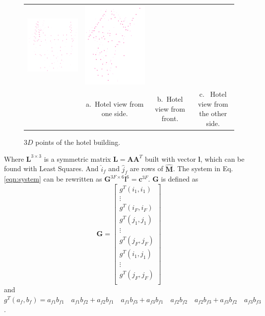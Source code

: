 \documentclass[]{IEEEtran}
\begin{document}
\begin{figure}[tb]
\begin{tabular}{c c c c}
    \includegraphics[width=0.3\linewidth]{./figures/3d/cv/snapshot01.png} &
    \includegraphics[width=0.22\linewidth]{./figures/3d/cv/snapshot02.png}\\
    & a.~Hotel view from one side. & b.~Hotel view from front. & c.~ Hotel view from the other side.\\
    \end{tabular}
    \caption{$3D$ points of the hotel building.}
    \label{fig:3dcloud}
\end{figure}

Where $\bm{L}^{3 \times 3}$ is a symmetric matrix $\bm{L} = \bm{A}\bm{A}^T$ built with vector $\bm{l}$, which can be found with Least Squares. And $\hat{i}_{f}$ and $\hat{j}_{f}$ are rows of $\hat{\bm{M}}$. The system in Eq. \ref{eqn:system} can be rewritten as $\bm{G}^{3F \times 6}\bm{l}^6 = \bm{c}^{3F}$. $\bm{G}$ is defined as
\[
\bm{G} =
\begin{bmatrix}
    g^T(i_{1},i_{1}) \\
    \vdots \\
    g^T(i_{F},i_{F}) \\
    g^T(j_{1},j_{1}) \\
    \vdots \\
    g^T(j_{F},j_{F}) \\
    g^T(i_{1},j_{1}) \\
    \vdots \\
    g^T(j_{F},j_{F}) \\
\end{bmatrix}
\]
and $g^T(a_{f},b_{f}) = a_{f1}b_{f1}\quad a_{f1}b_{f2} + a_{f2}b_{f1}\quad a_{f1}b_{f3} + a_{f3}b_{f1}\quad a_{f2}b_{f2}\quad a_{f2}b_{f3} + a_{f3}b_{f2}\quad a_{f3}b_{f3}$.
\end{document}
